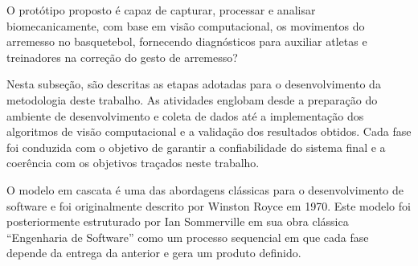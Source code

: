     
    
    
    
    
\label{sec:questoes-pesquisa}

O protótipo proposto é capaz de capturar, processar e analisar biomecanicamente, 
com base em visão computacional, os movimentos do arremesso no basquetebol, 
fornecendo diagnósticos para auxiliar atletas e treinadores na correção do gesto de arremesso?

\label{sec:aplicacao-metodologia}

Nesta subseção, são descritas as etapas adotadas para o desenvolvimento da metodologia deste trabalho. As atividades englobam desde a preparação do ambiente de desenvolvimento e coleta de dados até a 
implementação dos algoritmos de visão computacional e a validação dos resultados obtidos. Cada fase foi conduzida com o objetivo de garantir a confiabilidade do sistema final e a coerência com os objetivos traçados neste trabalho.

\label{ssec:populacao-amostra-participantes-estudo}

O modelo em cascata é uma das abordagens clássicas para o desenvolvimento de software e foi originalmente descrito por Winston Royce em 1970. 
Este modelo foi posteriormente estruturado por Ian Sommerville em sua obra clássica “Engenharia de Software” como um processo sequencial em que cada fase depende da entrega da anterior e gera um produto definido.


